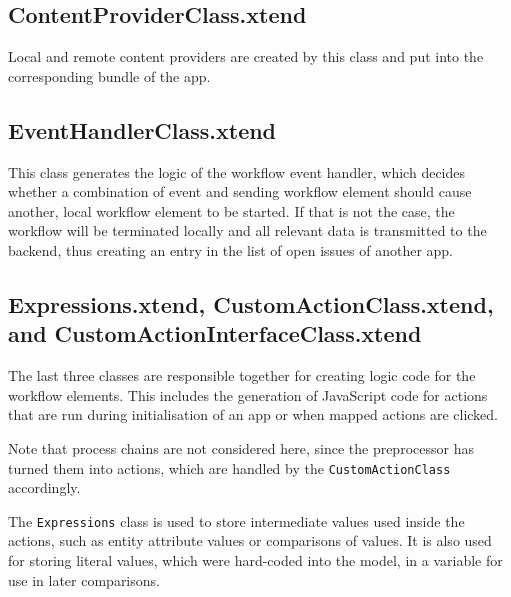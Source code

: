 \subsection{ContentProviderClass.xtend}
Local and remote content providers are created by this class and put into the corresponding bundle of the app.

\subsection{EventHandlerClass.xtend}
This class generates the logic of the workflow event handler, which decides whether a combination of event and sending workflow element should cause another, local workflow element to be started. If that is not the case, the workflow will be terminated locally and all relevant data is transmitted to the backend, thus creating an entry in the list of open issues of another app.

\subsection{Expressions.xtend, CustomActionClass.xtend, and CustomActionInterfaceClass.xtend}

The last three classes are responsible together for creating logic code for the workflow elements. This includes the generation of JavaScript code for actions that are run during initialisation of an app or when mapped actions are clicked. 

Note that process chains are not considered here, since the preprocessor has turned them into actions, which are handled by the \lstinline|CustomActionClass| accordingly.

The \lstinline|Expressions| class is used to store intermediate values used inside the actions, such as entity attribute values or comparisons of values. It is also used for storing literal values, which were hard-coded into the model, in a variable for use in later comparisons.

